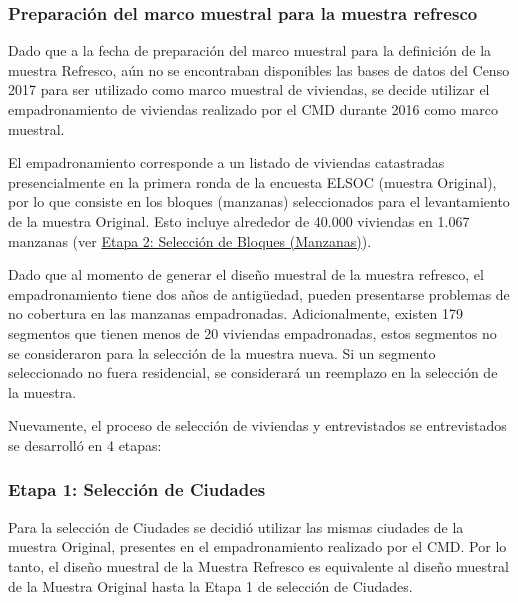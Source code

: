 \documentclass[
  12pt,
]{article}
\begin{document}
\hypertarget{preparaciuxf3n-del-marco-muestral-para-la-muestra-refresco}{%
\subsubsection*{Preparación del marco muestral para la muestra refresco}\label{preparaciuxf3n-del-marco-muestral-para-la-muestra-refresco}}

Dado que a la fecha de preparación del marco muestral para la definición de la muestra Refresco, aún no se encontraban disponibles las bases de datos del Censo 2017 para ser utilizado como marco muestral de viviendas, se decide utilizar el empadronamiento de viviendas realizado por el CMD durante 2016 como marco muestral.

El empadronamiento corresponde a un listado de viviendas catastradas presencialmente en la primera ronda de la encuesta ELSOC (muestra Original), por lo que consiste en los bloques (manzanas) seleccionados para el levantamiento de la muestra Original. Esto incluye alrededor de 40.000 viviendas en 1.067 manzanas (ver \protect\hyperlink{etapa2}{Etapa 2: Selección de Bloques (Manzanas)}).

Dado que al momento de generar el diseño muestral de la muestra refresco, el empadronamiento tiene dos años de antigüedad, pueden presentarse problemas de no cobertura en las manzanas empadronadas. Adicionalmente, existen 179 segmentos que tienen menos de 20 viviendas empadronadas, estos segmentos no se consideraron para la selección de la muestra nueva. Si un segmento seleccionado no fuera residencial, se considerará un reemplazo en la selección de la muestra.

Nuevamente, el proceso de selección de viviendas y entrevistados se entrevistados se desarrolló en 4 etapas:

\hypertarget{etapa1m2}{%
\subsubsection*{Etapa 1: Selección de Ciudades}\label{etapa1m2}}

Para la selección de Ciudades se decidió utilizar las mismas ciudades de la muestra Original, presentes en el empadronamiento realizado por el CMD. Por lo tanto, el diseño muestral de la Muestra Refresco es equivalente al diseño muestral de la Muestra Original hasta la Etapa 1 de selección de Ciudades.
\end{document}
